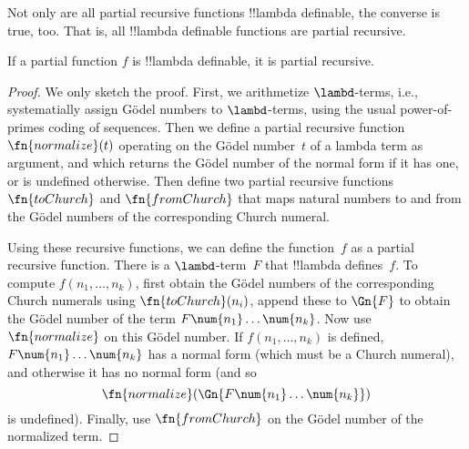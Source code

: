 \documentclass[../../../include/open-logic-section]{subfiles}
\begin{document}

Not only are all partial recursive functions !!{lambda definable}, the
converse is true, too. That is, all !!{lambda definable} functions are
partial recursive.

\begin{thm}
   If a partial function $f$ is
  !!{lambda definable}, it is partial recursive.
\end{thm}

\begin{proof}
  We only sketch the proof. First, we arithmetize $\lambd$-terms,
  i.e., systematially assign G\"odel numbers to $\lambd$-terms, using
  the usual power-of-primes coding of sequences. Then we define a
  partial recursive function $\fn{normalize}(t)$ operating on the
  G\"odel number~$t$ of a lambda term as argument, and which returns
  the G\"odel number of the normal form if it has one, or is undefined
  otherwise.  Then define two partial recursive functions
  $\fn{toChurch}$ and $\fn{fromChurch}$ that maps natural numbers to
  and from the G\"odel numbers of the corresponding Church numeral.

  Using these recursive functions, we can define the function~$f$ as a
  partial recursive function. There is a $\lambd$-term~$F$ that
  !!{lambda define}s~$f$. To compute $f(n_1, \dots, n_k)$, first obtain
  the G\"odel numbers of the corresponding Church numerals using
  $\fn{toChurch}(n_i)$, append these to $\Gn{F}$ to obtain the G\"odel
  number of the term $F \num{n_1}\dots\num{n_k}$. Now use
  $\fn{normalize}$ on this G\"odel number. If $f(n_1, \dots, n_k)$ is
  defined, $F \num{n_1}\dots\num{n_k}$ has a normal form (which must
  be a Church numeral), and otherwise it has no normal form (and so
  \[\fn{normalize}(\Gn{F\num{n_1}\dots\num{n_k}})\] is undefined).
  Finally, use $\fn{fromChurch}$ on the G\"odel number of the
  normalized term.
\end{proof}
\end{document}
